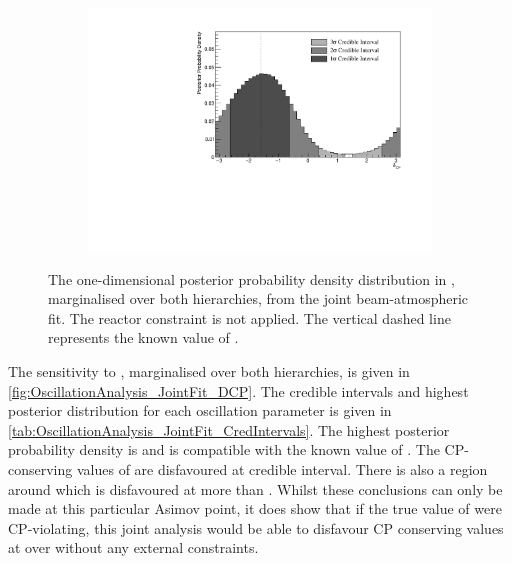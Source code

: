 \begin{figure}[h]
  \begin{subfigure}[t]{0.98\textwidth}
    \includegraphics[width=\textwidth, trim={0mm 0mm 0mm 0mm}, clip,page=1]{Figures/OA/JointFit/Contours_1D_dcp_BH_1_woRC_UnSmeared_CredibleInterval.pdf}
  \end{subfigure}
  \caption{The one-dimensional posterior probability density distribution in , marginalised over both hierarchies, from the joint beam-atmospheric fit. The reactor constraint is not applied. The vertical dashed line represents the known value of .}
  \label{fig:OscillationAnalysis_JointFit_DCP}
\end{figure}

The sensitivity to , marginalised over both hierarchies, is given in \autoref{fig:OscillationAnalysis_JointFit_DCP}. The credible intervals and highest posterior distribution for each oscillation parameter is given in \autoref{tab:OscillationAnalysis_JointFit_CredIntervals}. The highest posterior probability density is  and is compatible with the known value of . The CP-conserving values of  are disfavoured at \quickmath{1\sigma} credible interval. There is also a region around  which is disfavoured at more than \quickmath{3\sigma}. Whilst these conclusions can only be made at this particular Asimov point, it does show that if the true value of  were CP-violating, this joint analysis would be able to disfavour CP conserving values at over \quickmath{1\sigma} without any external constraints.

